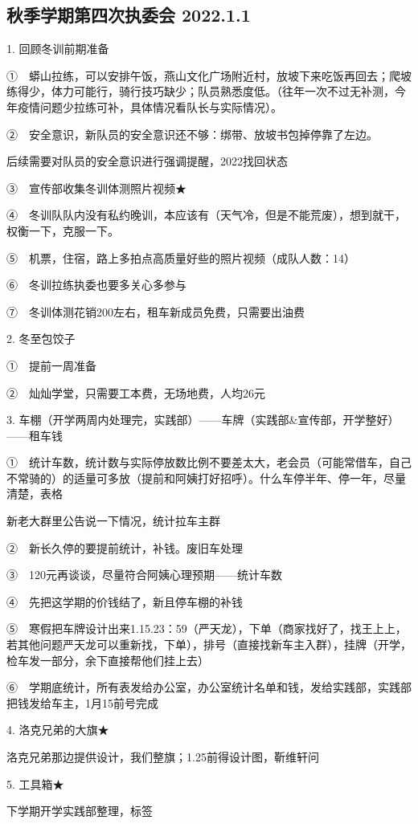 \documentclass{ctexbook}
\begin{document}
\subsection{秋季学期第四次执委会 2022.1.1}
1.	回顾冬训前期准备

①　蟒山拉练，可以安排午饭，燕山文化广场附近村，放坡下来吃饭再回去；爬坡练得少，体力可能行，骑行技巧缺少；队员熟悉度低。（往年一次不过无补测，今年疫情问题少拉练可补，具体情况看队长与实际情况）。

②　安全意识，新队员的安全意识还不够：绑带、放坡书包掉停靠了左边。   

后续需要对队员的安全意识进行强调提醒，2022找回状态~

③　宣传部收集冬训体测照片视频★

④　冬训队队内没有私约晚训，本应该有（天气冷，但是不能荒废），想到就干，权衡一下，克服一下。

⑤　机票，住宿，路上多拍点高质量好些的照片视频（成队人数：14）

⑥　冬训拉练执委也要多关心多参与

⑦　冬训体测花销200左右，租车新成员免费，只需要出油费

2.	冬至包饺子

①　提前一周准备

②　灿灿学堂，只需要工本费，无场地费，人均26元

3.	车棚（开学两周内处理完，实践部）——车牌（实践部\&宣传部，开学整好）——租车钱

①　统计车数，统计数与实际停放数比例不要差太大，老会员（可能常借车，自己不常骑的）的适量可多放（提前和阿姨打好招呼）。什么车停半年、停一年，尽量清楚，表格

新老大群里公告说一下情况，统计拉车主群

②　新长久停的要提前统计，补钱。废旧车处理

③　120元再谈谈，尽量符合阿姨心理预期——统计车数

④　先把这学期的价钱结了，新且停车棚的补钱

⑤　寒假把车牌设计出来1.15.23：59（严天龙），下单（商家找好了，找王上上，若其他问题严天龙可以重新找，下单），排号（直接找新车主入群），挂牌（开学，检车发一部分，余下直接帮他们挂上去）

⑥　学期底统计，所有表发给办公室，办公室统计名单和钱，发给实践部，实践部把钱发给车主，1月15前号完成

4.	洛克兄弟的大旗★

洛克兄弟那边提供设计，我们整旗；1.25前得设计图，靳维轩问

5.	工具箱★

下学期开学实践部整理，标签
\end{document}
